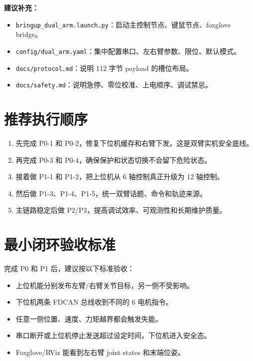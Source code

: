 \documentclass[UTF8,a4paper,11pt]{ctexart}
\begin{document}
\textbf{建议补充：}
\begin{itemize}[leftmargin=2em]
  \item \verb|bringup_dual_arm.launch.py|：启动主控制节点、键鼠节点、foxglove bridge。
  \item \verb|config/dual_arm.yaml|：集中配置串口、左右臂参数、限位、默认模式。
  \item \verb|docs/protocol.md|：说明 112 字节 payload 的槽位布局。
  \item \verb|docs/safety.md|：说明急停、零位校准、上电顺序、调试禁忌。
\end{itemize}

\section{推荐执行顺序}

\begin{enumerate}[leftmargin=2em]
  \item 先完成 P0-1 和 P0-2，修复下位机缓存和右臂下发。这是双臂实机安全底线。
  \item 再完成 P0-3 和 P0-4，确保保护和状态切换不会留下危险状态。
  \item 接着做 P1-1 和 P1-2，把上位机从 6 轴控制真正升级为 12 轴控制。
  \item 然后做 P1-3、P1-4、P1-5，统一双臂话题、命令和轨迹来源。
  \item 主链路稳定后做 P2/P3，提高调试效率、可观测性和长期维护质量。
\end{enumerate}

\section{最小闭环验收标准}

完成 P0 和 P1 后，建议按以下标准验收：

\begin{itemize}[leftmargin=2em]
  \item 上位机能分别发布左臂/右臂关节目标，另一侧不受影响。
  \item 下位机两条 FDCAN 总线收到不同的 6 电机指令。
  \item 任意一侧位置、速度、力矩越界都会触发失能。
  \item 串口断开或上位机停止发送超过设定时间，下位机进入安全态。
  \item Foxglove/RViz 能看到左右臂 joint states 和末端位姿。
\end{itemize}
\end{document}

